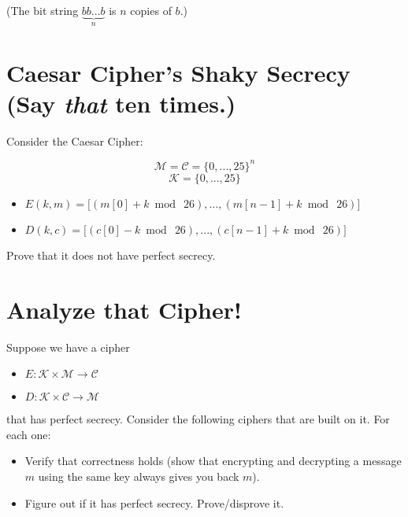 \documentclass[12pt]{article}
\begin{document}
(The bit string $\underset{n}{\underbrace{bb...b}}$ is $n$ copies of $b$.)





\section{Caesar Cipher's Shaky Secrecy (Say \emph{that} ten times.)}

Consider the Caesar Cipher:


$$\mathcal{M} = \mathcal{C} = \{0, ..., 25\}^n$$
$$\mathcal{K} = \{0, ..., 25\}$$

\begin{itemize}
\item $E(k, m) = \Big[(m[0] + k \bmod~26), ..., (m[n-1] + k \bmod~26)\Big]$
\item $D(k, c) = \Big[(c[0] - k \bmod~26), ..., (c[n-1] + k \bmod~26)\Big]$
\end{itemize}

Prove that it does not have perfect secrecy.



\section{Analyze that Cipher!\texttrademark}
Suppose we have a cipher

\begin{itemize}
\item $E : \mathcal{K} \times \mathcal{M} \to \mathcal{C}$
\item $D : \mathcal{K} \times \mathcal{C} \to \mathcal{M}$
\end{itemize}

that has perfect secrecy. Consider the following ciphers that are built on it. For each one:

\begin{itemize}
\item Verify that correctness holds (show that encrypting and decrypting a message $m$ using the same key always gives you back $m$).
\item Figure out if it has perfect secrecy. Prove/disprove it.
\end{itemize}
\end{document}
